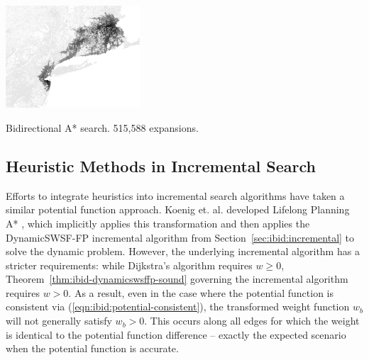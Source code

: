 \begin{marginfigure}%
   \centering%
   \includegraphics[width=5cm]{figs/incbi-road-ne/singleshot/example-heurbidijkstra.png}%
   \caption{Bidirectional A* search.
      515,588 expansions.}%
   \label{fig:ibid:example-heurbidijkstra}%
\end{marginfigure}


\subsection{Heuristic Methods in Incremental Search}
\label{subsec:ibid:heuristic-incremental}

Efforts to integrate heuristics into incremental search algorithms
have taken a similar potential function approach.
Koenig et. al. developed Lifelong Planning A* \citep{koenig2004lpastar},
which implicitly applies this transformation
and then applies the DynamicSWSF-FP incremental algorithm
\citep{ramalingam1996dynamicswsffp}
from Section~\ref{sec:ibid:incremental}
to solve the dynamic problem.
However,
the underlying incremental algorithm has a stricter requirements:
while Dijkstra's algorithm requires $w \geq 0$,
Theorem~\ref{thm:ibid-dynamicswsffp-sound} governing
the incremental algorithm requires $w > 0$.
As a result,
even in the case where the potential function is consistent
via (\ref{eqn:ibid:potential-consistent}),
the transformed weight function $w_b$ will not generally satisfy
$w_b > 0$.
This occurs along all edges for which the weight is identical to
the potential function difference
-- exactly the expected scenario when the potential function is
accurate.

